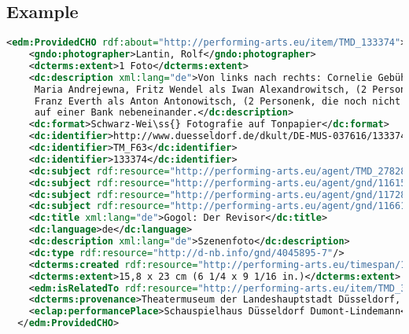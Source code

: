 \documentclass[12pt, a4paper, margin=2in]{report}
\begin{document}
\subsection*{Example}
\begin{lstlisting}[language=XML]
<edm:ProvidedCHO rdf:about="http://performing-arts.eu/item/TMD_133374">
    <gndo:photographer>Lantin, Rolf</gndo:photographer>
    <dcterms:extent>1 Foto</dcterms:extent>
    <dc:description xml:lang="de">Von links nach rechts: Cornelie Gebühr als Anna Andrejewna, Ehmi Bessel als
     Maria Andrejewna, Fritz Wendel als Iwan Alexandrowitsch, (2 Personen, die noch nicht identifiziert sind),
     Franz Everth als Anton Antonowitsch, (2 Personenk, die noch nicht identifiziert sind). Alle Personen sitzen
     auf einer Bank nebeneinander.</dc:description>
    <dc:format>Schwarz-Wei\ss{} Fotografie auf Tonpapier</dc:format>
    <dc:identifier>http://www.duesseldorf.de/dkult/DE-MUS-037616/133374</dc:identifier>
    <dc:identifier>TM_F63</dc:identifier>
    <dc:identifier>133374</dc:identifier>
    <dc:subject rdf:resource="http://performing-arts.eu/agent/TMD_27828"/>
    <dc:subject rdf:resource="http://performing-arts.eu/agent/gnd/116154519"/>
    <dc:subject rdf:resource="http://performing-arts.eu/agent/gnd/117284440"/>
    <dc:subject rdf:resource="http://performing-arts.eu/agent/gnd/116612355"/>
    <dc:title xml:lang="de">Gogol: Der Revisor</dc:title>
    <dc:language>de</dc:language>
    <dc:description xml:lang="de">Szenenfoto</dc:description>
    <dc:type rdf:resource="http://d-nb.info/gnd/4045895-7"/>
    <dcterms:created rdf:resource="http://performing-arts.eu/timespan/1927-01-01T00:00:00Z_1927-31-12T23:59:59Z"/>
    <dcterms:extent>15,8 x 23 cm (6 1/4 x 9 1/16 in.)</dcterms:extent>
    <edm:isRelatedTo rdf:resource="http://performing-arts.eu/item/TMD_32300"/>
    <dcterms:provenance>Theatermuseum der Landeshauptstadt Düsseldorf, Düsseldorf</dcterms:provenance>
    <eclap:performancePlace>Schauspielhaus Düsseldorf Dumont-Lindemann</eclap:performancePlace>
  </edm:ProvidedCHO>
\end{lstlisting}

\newpage
\end{document}
